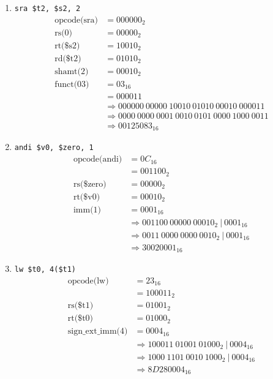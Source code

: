 \documentclass[12pt]{article}
\begin{document}
\begin{enumerate}
\begin{enumerate}
      \item \texttt{sra \$t2, \$s2, 2}
      \begin{align*}
        \text{opcode(sra)} &= 000000_2 \\
        \text{rs(0)} &= 00000_2 \\
        \text{rt(\$s2)} &= 10010_2 \\
        \text{rd(\$t2)} &= 01010_2 \\
        \text{shamt(2)} &= 00010_2 \\
        \text{funct(03)} &= 03_{16} \\
        &= 000011\\
        &\Rightarrow 000000 \ 00000 \ 10010 \ 01010 \ 00010 \ 000011\\
        &\Rightarrow 0000 \ 0000 \ 0001 \ 0010 \ 0101 \ 0000 \ 1000 \ 0011\\
        &\Rightarrow 00125083_{16}
      \end{align*}

      \item \texttt{andi \$v0, \$zero, 1}
      \begin{align*}
        \text{opcode(andi)} &= 0C_{16} \\
        &= 001100_2\\
        \text{rs(\$zero)} &= 00000_2 \\
        \text{rt(\$v0)} &= 00010_2\\
        \text{imm(1)} &= 0001_{16} \\
        &\Rightarrow 001100 \ 00000 \ 00010_2 \ | \ 0001_{16}\\
        &\Rightarrow 0011 \ 0000 \ 0000 \ 0010_2 \ | \ 0001_{16}\\
        &\Rightarrow 30020001_{16}
      \end{align*}

      \item \texttt{lw \$t0, 4(\$t1)}
      \begin{align*}
        \text{opcode(lw)} &= 23_{16} \\
        &= 100011_2\\
        \text{rs(\$t1)} &= 01001_2 \\
        \text{rt(\$t0)} &= 01000_2\\
        \text{sign\_ext\_imm(4)} &= 0004_{16} \\
        &\Rightarrow 100011 \ 01001 \ 01000_2 \ | \ 0004_{16}\\
        &\Rightarrow 1000 \ 1101 \ 0010 \ 1000_2 \ | \ 0004_{16}\\
        &\Rightarrow 8D280004_{16}
      \end{align*}


\end{enumerate}
\end{enumerate}
\end{document}
